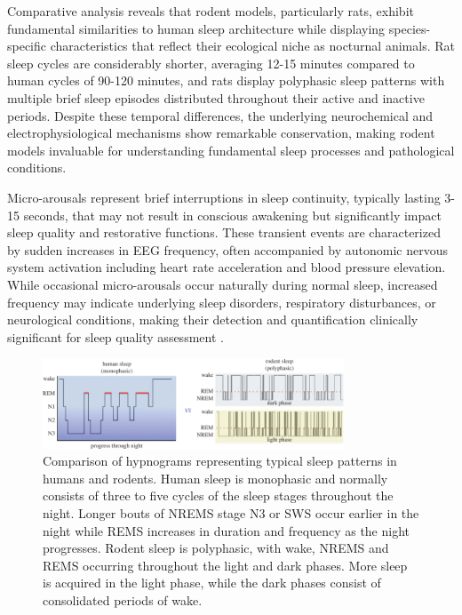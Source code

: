 \documentclass[a4paper,12pt,twoside]{article}
\begin{document}
Comparative analysis reveals that rodent models, particularly rats, exhibit fundamental similarities to human sleep architecture while displaying species-specific characteristics that reflect their ecological niche as nocturnal animals. Rat sleep cycles are considerably shorter, averaging 12-15 minutes compared to human cycles of 90-120 minutes, and rats display polyphasic sleep patterns with multiple brief sleep episodes distributed throughout their active and inactive periods. Despite these temporal differences, the underlying neurochemical and electrophysiological mechanisms show remarkable conservation, making rodent models invaluable for understanding fundamental sleep processes and pathological conditions.

Micro-arousals represent brief interruptions in sleep continuity, typically lasting 3-15 seconds, that may not result in conscious awakening but significantly impact sleep quality and restorative functions. These transient events are characterized by sudden increases in EEG frequency, often accompanied by autonomic nervous system activation including heart rate acceleration and blood pressure elevation. While occasional micro-arousals occur naturally during normal sleep, increased frequency may indicate underlying sleep disorders, respiratory disturbances, or neurological conditions, making their detection and quantification clinically significant for sleep quality assessment \cite{bonnet2007clinical}.

\begin{figure}[H]
    \centering
    \includegraphics[width=0.8\textwidth]{img/human vs rat sleep.png}
    \caption{Comparison of hypnograms representing typical sleep patterns in humans and rodents. Human sleep is monophasic and normally consists of three to five cycles of the sleep stages throughout the night. Longer bouts of NREMS stage N3 or SWS occur earlier in the night while REMS increases in duration and frequency as the night progresses. Rodent sleep is polyphasic, with wake, NREMS and REMS occurring throughout the light and dark phases. More sleep is acquired in the light phase, while the dark phases consist of consolidated periods of wake. \cite{mong2016sex}}
    \label{fig:sleep_architecture_comparison}
\end{figure}
\end{document}
